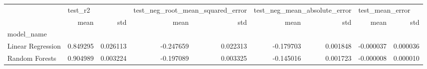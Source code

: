 \begin{tabular}{lrrrrrrrr}
\toprule
{} & \multicolumn{2}{l}{test\_r2} & \multicolumn{2}{l}{test\_neg\_root\_mean\_squared\_error} & \multicolumn{2}{l}{test\_neg\_mean\_absolute\_error} & \multicolumn{2}{l}{test\_mean\_error} \\
{} &      mean &       std &                             mean &       std &                         mean &       std &            mean &       std \\
model\_name        &           &           &                                  &           &                              &           &                 &           \\
\midrule
Linear Regression &  0.849295 &  0.026113 &                        -0.247659 &  0.022313 &                    -0.179703 &  0.001848 &       -0.000037 &  0.000036 \\
Random Forests    &  0.904989 &  0.003224 &                        -0.197089 &  0.003325 &                    -0.145016 &  0.001723 &       -0.000008 &  0.000010 \\
\bottomrule
\end{tabular}
